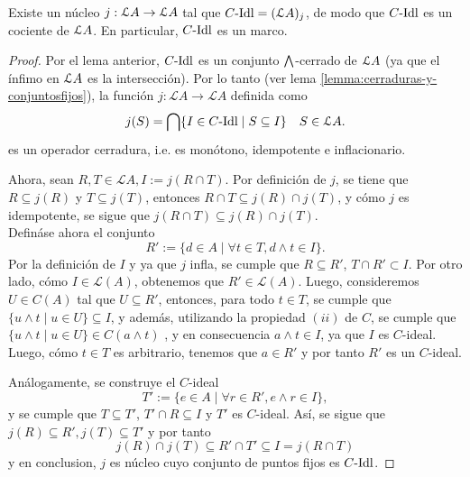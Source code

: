 \begin{lemma}
    Existe un núcleo $j:\cal LA\to\cal LA$ tal que
    $C\Idl=(\cal LA)_j$, de modo que $C\Idl$ es un cociente
    de $\cal LA$.
    En particular, $C\Idl$ es un marco.
\end{lemma}
\begin{proof}
  Por el lema anterior, $C\Idl$ es un conjunto $\Inf$-cerrado de $\cal
  LA$ (ya que el ínfimo en $\cal LA$ es la intersección). Por lo
  tanto (ver lema \ref{lemma:cerraduras-y-conjuntosfijos}), la función
  $j:\mathcal{L}A\to\mathcal{L}A$ definida como
    \begin{equation*}
        j(S)=\bigcap\{I\in C\Idl\mid S\subseteq I\}\quad S\in\mathcal{L}A.
    \end{equation*}
  es un operador cerradura, i.e. es monótono, idempotente e
  inflacionario.
    
    Ahora, sean $R,T\in\mathcal{L}A, I:=j(R\cap T)$. Por definición de $j$, se tiene que $R\subseteq j(R)$ y $T\subseteq j(T)$, entonces $R\cap T\subseteq j(R)\cap j(T)$, y cómo $j$ es idempotente, se sigue que $j(R\cap T)\subseteq j(R)\cap j(T)$.\\
    Defináse ahora el conjunto
    \begin{equation*}
        R' := \{d\in A\mid \forall t\in T,d\wedge t\in I\}.
    \end{equation*}
    Por la definición de $I$ y ya que $j$ infla, se cumple que
    $R\subseteq R'$, $T\cap R'\subset I$. Por otro lado, cómo
    $I\in\mathcal{L}(A)$, obtenemos que $R'\in\mathcal{L}(A)$. Luego,
    consideremos $U\in C(A)$ tal que $U\subseteq R'$, entonces, para
    todo $t\in T$, se cumple que $\{u\wedge t\mid u\in U\}\subseteq
    I$, y además, utilizando la propiedad $(ii)$ de $C$, se cumple que
    $\{u\wedge t\mid u\in U\}\in C(a\wedge t)$ , y en consecuencia
    $a\wedge t\in I$, ya que $I$ es $C$-ideal. Luego, cómo $t\in T$ es
    arbitrario, tenemos que $a\in R'$ y por tanto $R'$ es un
    $C$-ideal.
    
    Análogamente, se construye el $C$-ideal
    \begin{equation*}
         T' := \{e\in A\mid \forall r\in R',e\wedge r\in I\},
    \end{equation*}
    y se cumple que $T\subseteq T'$, $T'\cap R\subseteq I$ y $T'$ es $C$-ideal. Así, se sigue que $j(R)\subseteq R',j(T)\subseteq T'$ y por tanto
    \begin{equation*}
        j(R)\cap j(T)\subseteq R'\cap T' \subseteq  I = j(R\cap T)
    \end{equation*}
    y en conclusion, $j$ es núcleo cuyo conjunto de puntos fijos
    es $C\Idl$.
\end{proof}

